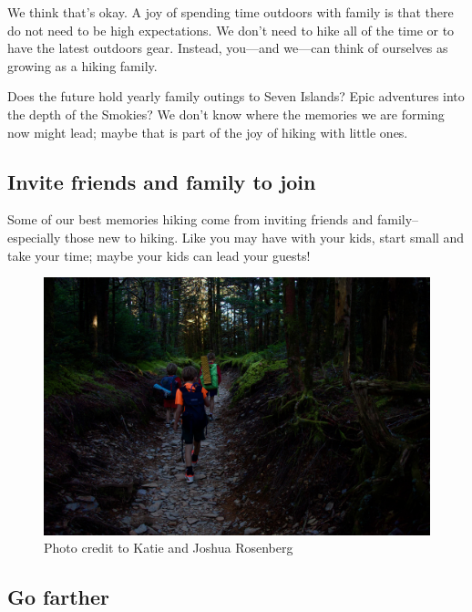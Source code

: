 \documentclass[
  letterpaper,
  DIV=11,
  numbers=noendperiod]{scrreprt}
\begin{document}
We think that's okay. A joy of spending time outdoors with family is
that there do not need to be high expectations. We don't need to hike
all of the time or to have the latest outdoors gear. Instead, you---and
we---can think of ourselves as growing as a hiking family.

Does the future hold yearly family outings to Seven Islands? Epic
adventures into the depth of the Smokies? We don't know where the
memories we are forming now might lead; maybe that is part of the joy of
hiking with little ones.

\subsection{Invite friends and family to
join}\label{invite-friends-and-family-to-join}

Some of our best memories hiking come from inviting friends and
family--especially those new to hiking. Like you may have with your
kids, start small and take your time; maybe your kids can lead your
guests!

\begin{figure}[H]

{\centering \includegraphics[width=10.41667in,height=\textheight,keepaspectratio]{img/kids-leconte.jpeg}

}

\caption{Photo credit to Katie and Joshua Rosenberg}

\end{figure}%

\subsection{Go farther}\label{go-farther}
\end{document}
